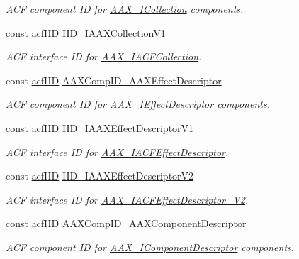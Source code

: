 \begin{Indent}
\begin{DoxyCompactItemize}
\begin{DoxyCompactList}\small\item\em A\+CF component ID for \mbox{\hyperlink{a01777}{A\+A\+X\+\_\+\+I\+Collection}} components. \end{DoxyCompactList}\item 
const \mbox{\hyperlink{a00269_a59df0b41744eee7a066787aaedf97f67}{acf\+I\+ID}} \mbox{\hyperlink{a00683_a2dbdb6a2a17831779b25bd74116ed836}{I\+I\+D\+\_\+\+I\+A\+A\+X\+Collection\+V1}}
\begin{DoxyCompactList}\small\item\em A\+CF interface ID for \mbox{\hyperlink{a01621}{A\+A\+X\+\_\+\+I\+A\+C\+F\+Collection}}. \end{DoxyCompactList}\item 
const \mbox{\hyperlink{a00269_a59df0b41744eee7a066787aaedf97f67}{acf\+I\+ID}} \mbox{\hyperlink{a00683_afd8738bffaa66c1178a0ca1172861773}{A\+A\+X\+Comp\+I\+D\+\_\+\+A\+A\+X\+Effect\+Descriptor}}
\begin{DoxyCompactList}\small\item\em A\+CF component ID for \mbox{\hyperlink{a01813}{A\+A\+X\+\_\+\+I\+Effect\+Descriptor}} components. \end{DoxyCompactList}\item 
const \mbox{\hyperlink{a00269_a59df0b41744eee7a066787aaedf97f67}{acf\+I\+ID}} \mbox{\hyperlink{a00683_a009151e7f4d79356c7e2da2b2094e5e4}{I\+I\+D\+\_\+\+I\+A\+A\+X\+Effect\+Descriptor\+V1}}
\begin{DoxyCompactList}\small\item\em A\+CF interface ID for \mbox{\hyperlink{a01653}{A\+A\+X\+\_\+\+I\+A\+C\+F\+Effect\+Descriptor}}. \end{DoxyCompactList}\item 
const \mbox{\hyperlink{a00269_a59df0b41744eee7a066787aaedf97f67}{acf\+I\+ID}} \mbox{\hyperlink{a00683_ab26eee1ffa892e6c7ca88d16f967c0da}{I\+I\+D\+\_\+\+I\+A\+A\+X\+Effect\+Descriptor\+V2}}
\begin{DoxyCompactList}\small\item\em A\+CF interface ID for \mbox{\hyperlink{a01657}{A\+A\+X\+\_\+\+I\+A\+C\+F\+Effect\+Descriptor\+\_\+\+V2}}. \end{DoxyCompactList}\item 
const \mbox{\hyperlink{a00269_a59df0b41744eee7a066787aaedf97f67}{acf\+I\+ID}} \mbox{\hyperlink{a00683_a765e040fc408fdf5c21f7078d3a38566}{A\+A\+X\+Comp\+I\+D\+\_\+\+A\+A\+X\+Component\+Descriptor}}
\begin{DoxyCompactList}\small\item\em A\+CF component ID for \mbox{\hyperlink{a01781}{A\+A\+X\+\_\+\+I\+Component\+Descriptor}} components. \end{DoxyCompactList}\item 

\end{DoxyCompactItemize}
\end{Indent}
